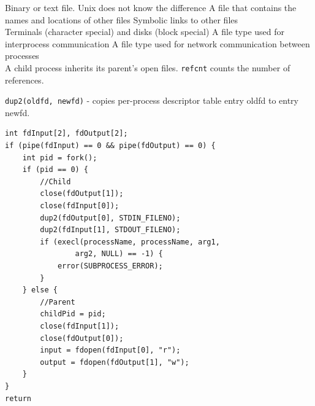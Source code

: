 \documentclass[number]{notes}
\begin{document}
\begin{landscape}
\begin{multicols}{3}
Binary or text file. Unix does not know the difference
A file that contains the names and locations of other files
Symbolic links to other files\\
Terminals (character special) and disks (block special)
A file type used for interprocess communication
A file type used for network communication between processes\\
A child process inherits its parent's open files. \texttt{refcnt} counts the number of references.

\texttt{dup2(oldfd, newfd)} - copies per-process descriptor table entry oldfd to entry newfd.
\begin{minipage}{\linewidth}
\begin{lstlisting}
int fdInput[2], fdOutput[2];
if (pipe(fdInput) == 0 && pipe(fdOutput) == 0) {
    int pid = fork();
    if (pid == 0) {
        //Child
        close(fdOutput[1]);
        close(fdInput[0]);
        dup2(fdOutput[0], STDIN_FILENO);
        dup2(fdInput[1], STDOUT_FILENO);
        if (execl(processName, processName, arg1,
                arg2, NULL) == -1) {
            error(SUBPROCESS_ERROR);
        }
    } else {
        //Parent
        childPid = pid;
        close(fdInput[1]);
        close(fdOutput[0]);
        input = fdopen(fdInput[0], "r");
        output = fdopen(fdOutput[1], "w");
    }
}
return
\end{lstlisting}
\end{minipage}


\end{multicols}
\end{landscape}
\end{document}
